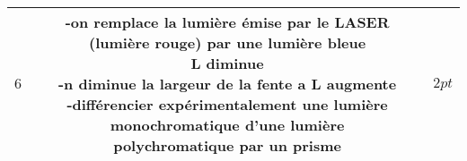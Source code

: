 \documentclass[12pt]{article}
\begin{document}
\begin{center}
\begin{tabular}{|c||c||c|}
 $6$ &
 \makecell{-on remplace la lumière émise par le LASER (lumière rouge) par une lumière bleue\\L diminue\\
	 -n diminue la largeur de la fente a L augmente\\
	 -différencier expérimentalement une lumière monochromatique d’une lumière \\ polychromatique  par un prisme
}
 & $2pt$\\\hline











  \end{tabular}
  \end{center}
\end{document}
